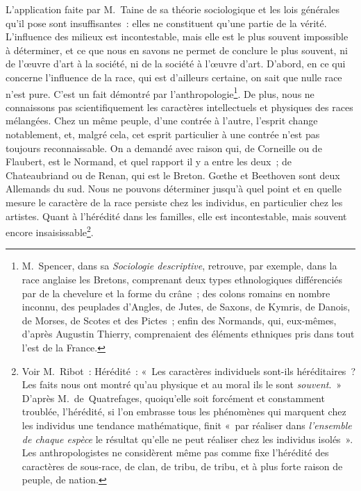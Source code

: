 \documentclass[french,twoside]{book} %
\begin{document}
L’application faite par M. Taine de sa théorie sociologique et les lois générales qu’il pose sont insuffisantes : elles ne constituent qu’une partie de la vérité. L’influence des milieux est incontestable, mais elle est le plus souvent impossible à déterminer, et ce que nous en savons ne permet de conclure le plus souvent, ni de l’œuvre d’art à la société, ni de la société à l’œuvre d’art. D’abord, en ce qui concerne l’influence de la race, qui est d’ailleurs certaine, on sait que nulle race n’est pure. C’est un fait démontré par l’anthropologie\footnote{ M. Spencer, dans sa \emph{Sociologie descriptive}, retrouve, par exemple, dans la race anglaise les Bretons, comprenant deux types ethnologiques différenciés par de la chevelure et la forme du crâne ; des colons romains en nombre inconnu, des peuplades d’Angles, de Jutes, de Saxons, de Kymris, de Danois, de Morses, de Scotes et des Pictes ; enfin des Normands, qui, eux-mêmes, d’après Augustin Thierry, comprenaient des éléments ethniques pris dans tout l’est de la France.}. De plus, nous ne connaissons pas scientifiquement les caractères intellectuels et physiques des races mélangées. Chez un même peuple, d’une contrée à l’autre, l’esprit change notablement, et, malgré cela, cet esprit particulier à une contrée n’est pas toujours reconnaissable. On a demandé avec raison qui, de Corneille ou de Flaubert, est le Normand, et quel rapport il y a entre les deux ; de Chateaubriand ou de Renan, qui est le Breton. Gœthe et Beethoven sont deux Allemands du sud. Nous ne pouvons déterminer jusqu’à quel point et en quelle mesure le caractère de la race persiste chez les individus, en particulier chez les artistes. Quant à l’hérédité dans les familles, elle est incontestable, mais souvent encore insaisissable\footnote{ Voir M. Ribot : Hérédité : « Les caractères individuels sont-ils héréditaires ? Les faits nous ont montré qu’au physique et au moral ils le sont {\itshape souvent}. » D’après M. de Quatrefages, quoiqu’elle soit forcément et constamment troublée, l’hérédité, si l’on embrasse tous les phénomènes qui marquent chez les individus une tendance mathématique, finit « par réaliser dans \emph{l’ensemble de chaque espèce} le résultat qu’elle ne peut réaliser chez les individus isolés ». Les anthropologistes ne considèrent même pas comme fixe l’hérédité des caractères de sous-race, de clan, de tribu, de tribu, et à plus forte raison de peuple, de nation.}.\par
\end{document}
